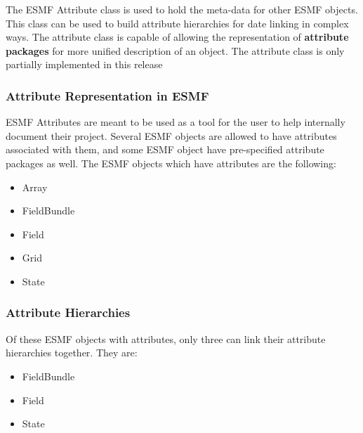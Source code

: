 %

The ESMF Attribute class is used to hold the meta-data for other ESMF objects.  This class can be used to build attribute hierarchies for date linking in complex ways.  The attribute class is capable of allowing the representation of {\bf attribute packages} for more unified description of an object.  The attribute class is only partially implemented in this release 

\subsubsection{Attribute Representation in ESMF}

ESMF Attributes are meant to be used as a tool for the user to help internally document their project.   Several ESMF objects are allowed to have attributes associated with them, and some ESMF object have pre-specified attribute packages as well.  The ESMF objects which have attributes are the following:

\begin{itemize}
\item Array
\item FieldBundle
\item Field
\item Grid
\item State
\end{itemize}

\subsubsection{Attribute Hierarchies}

Of these ESMF objects with attributes, only three can link their attribute hierarchies together.  They are:

\begin{itemize}
\item FieldBundle
\item Field
\item State
\end{itemize}

